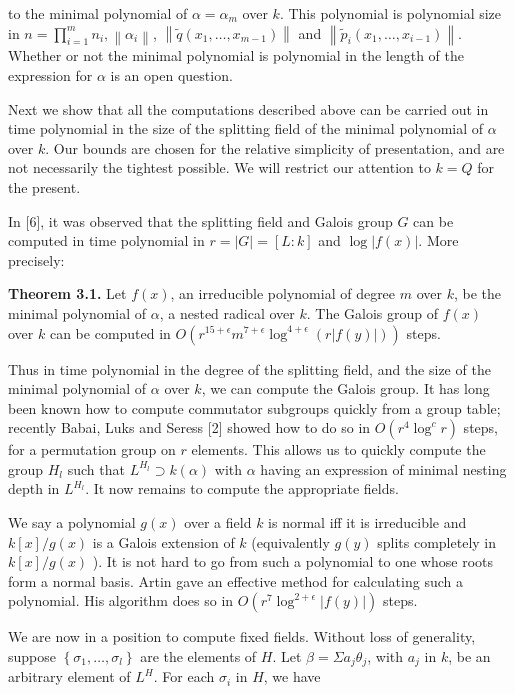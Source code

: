 \documentclass[11pt,letterpaper]{article}
\begin{document}
to the minimal polynomial of $\alpha=\alpha_{m}$ over $k$. This polynomial is polynomial size in $n=\prod_{i=1}^{m} n_i,\left\|\alpha_{i}\right\|$, $\left\|\tilde{q}\left(x_{1}, \ldots, x_{m-1}\right)\right\|$ and $\left\|\tilde{p}_{i}\left(x_{1}, \ldots, x_{i-1}\right)\right\|$. Whether or not the minimal polynomial is polynomial in the length of the expression for $\alpha$ is an open question.

Next we show that all the computations described above can be carried out in time polynomial in the size of the splitting field of the minimal polynomial of $\alpha$ over $k$. Our bounds are chosen for the relative simplicity of presentation, and are not necessarily the tightest possible. We will restrict our attention to $k=Q$ for the present.

In [6], it was observed that the splitting field and Galois group $G$ can be computed in time polynomial in $r=|G|=[L: k]$ and $\log |f(x)|$. More precisely:

\noindent\textbf{Theorem 3.1.} Let $f(x)$, an irreducible polynomial of degree $m$ over $k$, be the minimal polynomial of $\alpha$, a nested radical over $k$. The Galois group of $f(x)$ over $k$ can be computed in $O\left(r^{15+\epsilon} m^{7+\epsilon} \log ^{4+\epsilon}(r|f(y)|)\right)$ steps.

Thus in time polynomial in the degree of the splitting field, and the size of the minimal polynomial of $\alpha$ over $k$, we can compute the Galois group. It has long been known how to compute commutator subgroups quickly from a group table; recently Babai, Luks and Seress [2] showed how to do so in $O\left(r^{4} \log ^{c} r\right)$ steps, for a permutation group on $r$ elements. This allows us to quickly compute the group $H_{l}$ such that $L^{H_{l}} \supset k(\alpha)$ with $\alpha$ having an expression of minimal nesting depth in $L^{H_l}$. It now remains to compute the appropriate fields.

We say a polynomial $g(x)$ over a field $k$ is normal iff it is irreducible and $k[x] / g(x)$ is a Galois extension of $k$ (equivalently $g(y)$ splits completely in $k[x] / g(x)$ ). It is not hard to go from such a polynomial to one whose roots form a normal basis. Artin gave an effective method for calculating such a polynomial. His algorithm does so in $O\left(r^{7} \log ^{2+\epsilon}|f(y)|\right)$ steps.

We are now in a position to compute fixed fields. Without loss of generality, suppose $\left\{\sigma_{1}, \ldots, \sigma_{l}\right\}$ are the elements of $H$. Let $\beta=\Sigma a_{j} \theta_{j}$, with $a_{j}$ in $k$, be an arbitrary element of $L^{H}$. For each $\sigma_{i}$ in $H$, we have
\end{document}

